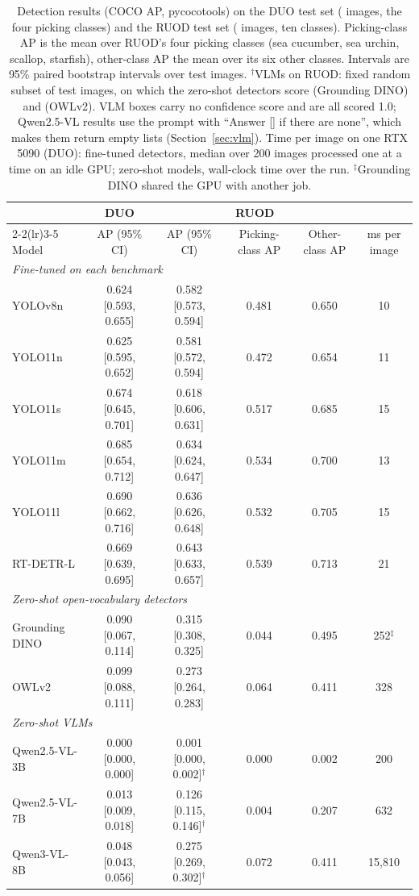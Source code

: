 \begin{table}[t]
\centering
\small
\begin{tabular}{lccccc}
\toprule
 & DUO & \multicolumn{3}{c}{RUOD} & \\
\cmidrule(lr){2-2}\cmidrule(lr){3-5}
Model & AP (95\% CI) & AP (95\% CI) & Picking-class AP & Other-class AP & ms per image \\
\midrule
\multicolumn{6}{l}{\textit{Fine-tuned on each benchmark}} \\
YOLOv8n & 0.624 [0.593, 0.655] & 0.582 [0.573, 0.594] & 0.481 & 0.650 & 10 \\
YOLO11n & 0.625 [0.595, 0.652] & 0.581 [0.572, 0.594] & 0.472 & 0.654 & 11 \\
YOLO11s & 0.674 [0.645, 0.701] & 0.618 [0.606, 0.631] & 0.517 & 0.685 & 15 \\
YOLO11m & 0.685 [0.654, 0.712] & 0.634 [0.624, 0.647] & 0.534 & 0.700 & 13 \\
YOLO11l & 0.690 [0.662, 0.716] & 0.636 [0.626, 0.648] & 0.532 & 0.705 & 15 \\
RT-DETR-L & 0.669 [0.639, 0.695] & 0.643 [0.633, 0.657] & 0.539 & 0.713 & 21 \\
\midrule
\multicolumn{6}{l}{\textit{Zero-shot open-vocabulary detectors}} \\
Grounding DINO & 0.090 [0.067, 0.114] & 0.315 [0.308, 0.325] & 0.044 & 0.495 & 252$^\ddagger$ \\
OWLv2 & 0.099 [0.088, 0.111] & 0.273 [0.264, 0.283] & 0.064 & 0.411 & 328 \\
\midrule
\multicolumn{6}{l}{\textit{Zero-shot VLMs}} \\
Qwen2.5-VL-3B & 0.000 [0.000, 0.000] & 0.001 [0.000, 0.002]$^\dagger$ & 0.000 & 0.002 & 200 \\
Qwen2.5-VL-7B & 0.013 [0.009, 0.018] & 0.126 [0.115, 0.146]$^\dagger$ & 0.004 & 0.207 & 632 \\
Qwen3-VL-8B & 0.048 [0.043, 0.056] & 0.275 [0.269, 0.302]$^\dagger$ & 0.072 & 0.411 & 15{,}810 \\
\bottomrule
\end{tabular}
\caption{Detection results (COCO AP, pycocotools) on the DUO test set (\nTestImages{} images, the four picking classes) and the RUOD test set (\rTestImages{} images, ten classes). Picking-class AP is the mean over RUOD's four picking classes (sea cucumber, sea urchin, scallop, starfish), other-class AP the mean over its six other classes. Intervals are 95\% paired bootstrap intervals over test images. $^\dagger$VLMs on RUOD: fixed random subset of \rSubset{} test images, on which the zero-shot detectors score \rApSubGD{} (Grounding DINO) and \rApSubOWL{} (OWLv2). VLM boxes carry no confidence score and are all scored 1.0; Qwen2.5-VL results use the prompt with ``Answer [] if there are none'', which makes them return empty lists (Section~\ref{sec:vlm}). Time per image on one RTX 5090 (DUO): fine-tuned detectors, median over 200 images processed one at a time on an idle GPU; zero-shot models, wall-clock time over the run. $^\ddagger$Grounding DINO shared the GPU with another job.}
\label{tab:main}
\end{table}
